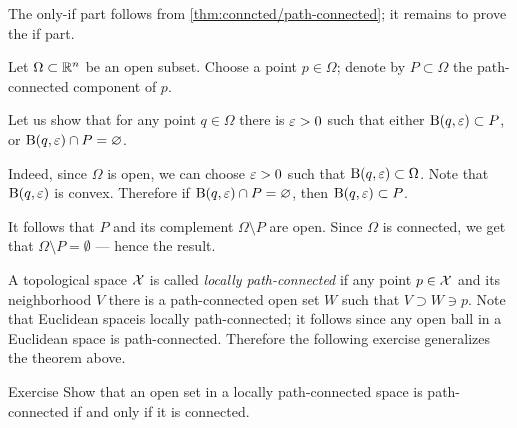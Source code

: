 The only-if part follows from \ref{thm:conncted/path-connected};
it remains to prove the if part.

Let $\Omega\subset\mathbb{R}^n$ be an open subset.
Choose a point $p\in\Omega$; denote by $P\subset \Omega$ the path-connected component of $p$.

Let us show that for any point $q\in \Omega$ there is $\varepsilon>0$ such that either $\mathrm{B}(q,\varepsilon)\subset P$, or $\mathrm{B}(q,\varepsilon)\cap P=\varnothing$.

Indeed, since $\Omega$ is open, we can choose $\varepsilon>0$ such that $\Ball(q,\eps)\z\subset\Omega$.
Note that $\mathrm{B}(q,\varepsilon)$ is convex.
Therefore if $\mathrm{B}(q,\varepsilon)\cap P=\varnothing$, then $\mathrm{B}(q,\varepsilon)\subset P$.

It follows that $P$ and its complement $\Omega\setminus P$ are open.
Since $\Omega$ is connected, we get that $\Omega\setminus P=\emptyset$ --- hence the result.
\qeds

A topological space $\mathcal{X}$ is called \emph{locally path-connected} if any point $p\in\mathcal{X}$ and its neighborhood $V$ there is a path-connected open set $W$ such that $V\supset W\ni p$. 
Note that Euclidean spaceis locally path-connected;
it follows since any open ball in a Euclidean space is path-connected.
Therefore the following exercise generalizes the theorem above.

\begin{thm}{Exercise}
Show that an open set in a locally path-connected space is path-connected if and only if it is connected.
\end{thm}

